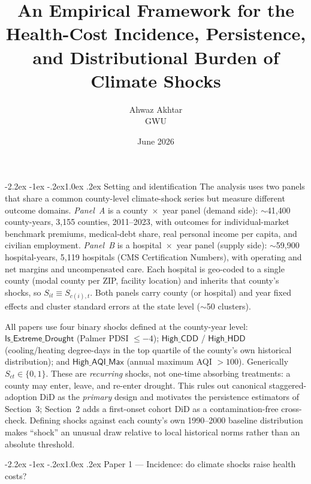 \documentclass[11pt]{article}
\title{\vspace{-1.2cm}\bfseries An Empirical Framework for the Health-Cost
Incidence, Persistence, and Distributional Burden of Climate Shocks}
\author{Ahwaz Akhtar\\[-2pt]\normalsize GWU}
\date{\normalsize June 2026}
\makeatletter
\renewcommand\section{\@startsection{section}{1}{\z@}%
  {-2.2ex \@plus -1ex \@minus -.2ex}{1.0ex \@plus .2ex}%
  {\normalfont\large\bfseries}}
\newcommand{\Sct}{S_{ct}}
\makeatother
\begin{document}
\maketitle
\vspace{-0.7cm}

\section{Setting and identification}
The analysis uses two panels that share a common county-level climate-shock
series but measure different outcome domains. \emph{Panel~A} is a
county~$\times$~year panel (demand side): $\sim$41{,}400 county-years, 3{,}155
counties, 2011--2023, with outcomes for individual-market benchmark premiums,
medical-debt share, real personal income per capita, and civilian employment.
\emph{Panel~B} is a hospital~$\times$~year panel (supply side): $\sim$59{,}900
hospital-years, 5{,}119 hospitals (CMS Certification Numbers), with operating and
net margins and uncompensated care. Each hospital is geo-coded to a single county
(modal county per ZIP, facility location) and inherits that county's shocks, so
$S_{it}\equiv S_{c(i),t}$. Both panels carry county (or hospital) and year fixed
effects and cluster standard errors at the state level ($\sim$50 clusters).

All papers use four binary shocks defined at the county-year level:
$\textsf{Is\_Extreme\_Drought}$ (Palmer PDSI $\le-4$);
$\textsf{High\_CDD}$ / $\textsf{High\_HDD}$ (cooling/heating degree-days in the top
quartile of the county's own historical distribution); and
$\textsf{High\_AQI\_Max}$ (annual maximum AQI $>100$). Generically
$\Sct\in\{0,1\}$. These are \emph{recurring} shocks, not one-time absorbing
treatments: a county may enter, leave, and re-enter drought. This rules out
canonical staggered-adoption DiD as the \emph{primary} design and motivates the
persistence estimators of Section~3; Section~2 adds a first-onset cohort DiD as a
contamination-free cross-check. Defining shocks against each county's own
1990--2000 baseline distribution makes ``shock'' an unusual draw relative to local
historical norms rather than an absolute threshold.

\section{Paper 1 --- Incidence: do climate shocks raise health costs?}
\end{document}

